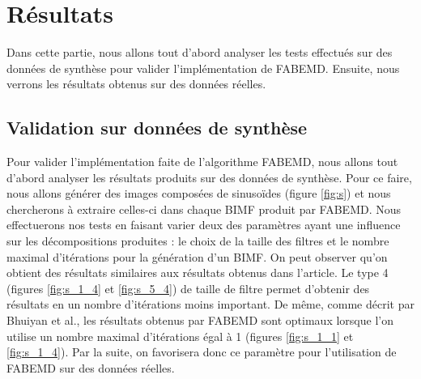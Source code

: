 \chapter{Résultats}
Dans cette partie, nous allons tout d'abord analyser les tests effectués sur des données de synthèse pour valider l'implémentation de FABEMD. Ensuite, nous verrons les résultats obtenus sur des données réelles.
\section{Validation sur données de synthèse}
Pour valider l'implémentation faite de l'algorithme FABEMD, nous allons tout d'abord analyser les résultats produits sur des données de synthèse. Pour ce faire, nous allons générer des images composées de sinusoïdes (figure \ref{fig:s}) et nous chercherons à extraire celles-ci dans chaque BIMF produit par FABEMD. Nous effectuerons nos tests en faisant varier deux des paramètres ayant une influence sur les décompositions produites : le choix de la taille des filtres et le nombre maximal d'itérations pour la génération d'un BIMF.
On peut observer qu'on obtient des résultats similaires aux résultats obtenus dans l'article. Le type 4 (figures \ref{fig:s_1_4} et \ref{fig:s_5_4}) de taille de filtre permet d'obtenir des résultats en un nombre d'itérations moins important. De même, comme décrit par Bhuiyan et al., les résultats obtenus par FABEMD sont optimaux lorsque l'on utilise un nombre maximal d'itérations égal à 1 (figures \ref{fig:s_1_1} et \ref{fig:s_1_4}). Par la suite, on favorisera donc ce paramètre pour l'utilisation de FABEMD sur des données réelles.

